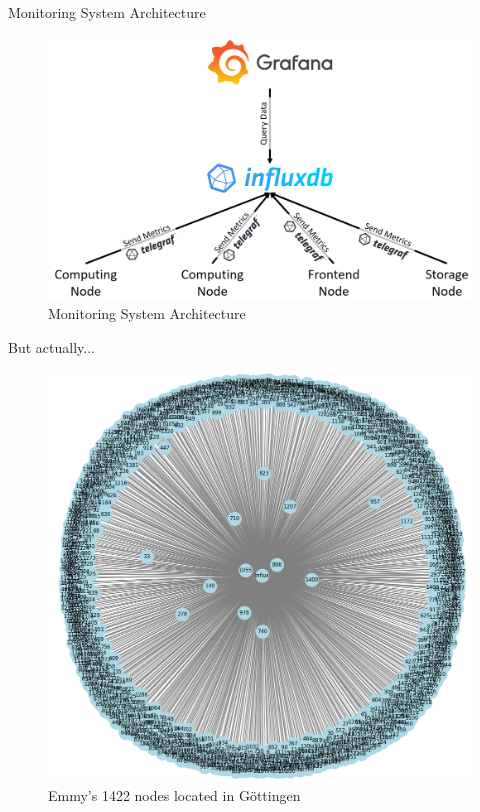 \documentclass[compress,aspectratio=169]{beamer}
\begin{document}
\begin{frame}{Monitoring System Architecture}
\begin{center}
\begin{figure}
  \includegraphics[height=.8\textheight]{assets/monitoring_system_architecture.png}
  \caption{Monitoring System Architecture}
\end{figure}
\end{center}
\end{frame}

\begin{frame}{But actually...}
\begin{center}
\begin{figure}
  \includegraphics[height=.8\textheight]{assets/monitoring_system_architecture_2.png}
  \caption{Emmy's 1422 nodes located in G\"ottingen}
\end{figure}
\end{center}
\end{frame}
\end{document}
